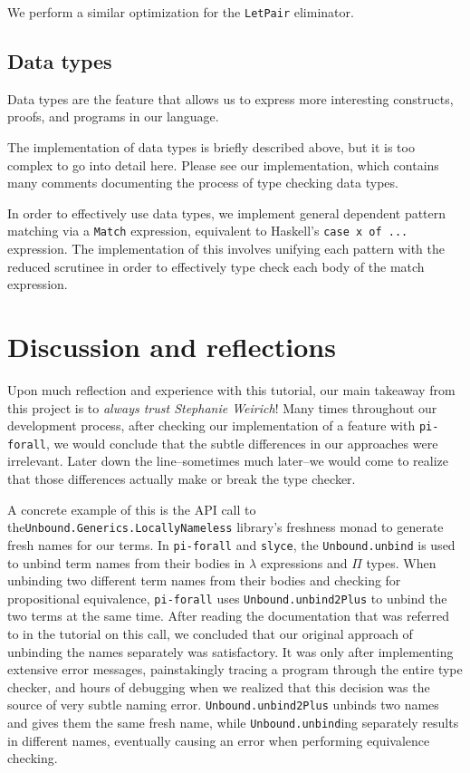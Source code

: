 We perform a similar optimization for the \texttt{LetPair} eliminator.

\subsection{Data types}
Data types are the feature that allows us to express more interesting
constructs, proofs, and programs in our language.

The implementation of data types is briefly described above, but it is too
complex to go into detail here. Please see our implementation, which contains
many comments documenting the process of type checking data types.

In order to effectively use data types, we implement general dependent pattern
matching via a \texttt{Match} expression, equivalent to Haskell's
\texttt{case x of ...} expression. The implementation of this involves
unifying each pattern with the reduced scrutinee in order to effectively
type check each body of the match expression.

\section{Discussion and reflections}\label{reflection}
Upon much reflection and experience with this tutorial, our main takeaway from this project is to \emph{always trust Stephanie Weirich}!
Many times throughout our development process, after checking our implementation of a feature with \texttt{pi-forall}, we would conclude that the subtle differences in our approaches were irrelevant.
Later down the line--sometimes much later--we would come to realize that those differences actually make or break the type checker.

A concrete example of this is the API call to the\newline \texttt{Unbound.Generics.LocallyNameless} library's freshness monad to generate fresh names for our terms. 
In \texttt{pi-forall} and \texttt{slyce}, the \texttt{Unbound.unbind} is used to unbind term names from their bodies in $\lambda$ expressions and $\Pi$ types.
When unbinding two different term names from their bodies and checking for propositional equivalence, \texttt{pi-forall} uses \texttt{Unbound.unbind2Plus} to unbind the two terms at the same time. 
After reading the documentation that was referred to in the tutorial on this call, we concluded that our original approach of unbinding the names separately was satisfactory. 
It was only after implementing extensive error messages, painstakingly tracing a program through the entire type checker, and hours of debugging when we realized that this decision was the source of very subtle naming error.
\texttt{Unbound.unbind2Plus} unbinds two names and gives them the same fresh name, while \texttt{Unbound.unbind}ing separately results in different names, eventually causing an error when performing equivalence checking.

